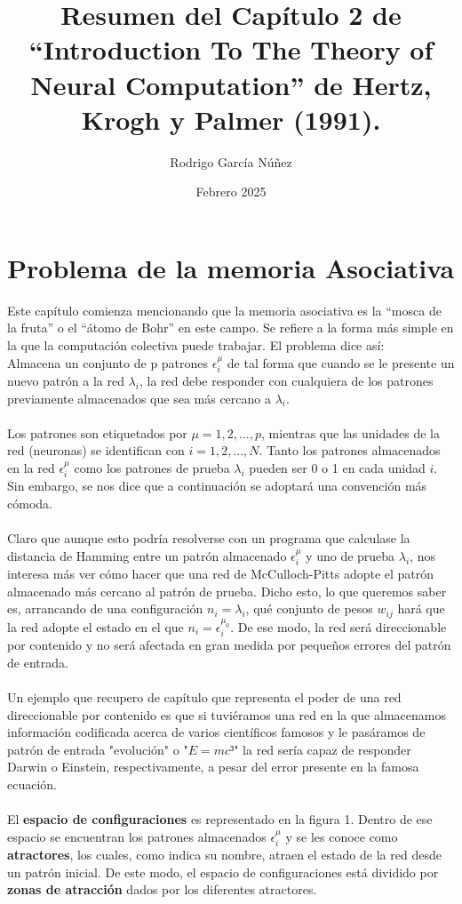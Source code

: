 \documentclass{article}
\title{Resumen del Capítulo 2 de “Introduction To The Theory of Neural Computation” de Hertz, Krogh y Palmer (1991).}
\author{Rodrigo García Núñez}
\affil{Universidad Autónoma Metropolitana }
\date{Febrero 2025}
\begin{document}
\maketitle

\section{Problema de la memoria Asociativa}

Este capítulo comienza mencionando que la memoria asociativa es la “mosca de la fruta” o
el “átomo de Bohr” en este campo. Se refiere a la forma más simple en la que la
computación colectiva puede trabajar. El problema dice así:
\\
Almacena un conjunto de p patrones $\epsilon^\mu_i$ de tal forma que cuando se le presente un nuevo patrón a la red $\lambda_i$, la red debe responder con cualquiera de los patrones previamente almacenados que sea más cercano a $\lambda_i$.
\\\\
Los patrones son etiquetados por $\mu = 1, 2, ..., p$, mientras que las unidades de la red (neuronas) se identifican con $i= 1, 2, ..., N$. Tanto los patrones almacenados en la red $\epsilon^\mu_i$ como los patrones de prueba $\lambda_i$ pueden ser 0 o 1 en cada unidad $i$. Sin embargo, se nos dice que a continuación se adoptará una convención más cómoda.
\\\\
Claro que aunque esto podría resolverse con un programa que calculase la distancia de Hamming entre un patrón almacenado $\epsilon^\mu_i$ y uno de prueba $\lambda_i$, nos interesa más ver cómo hacer que una red de McCulloch-Pitts adopte el patrón almacenado más cercano al patrón de prueba. Dicho esto, lo que queremos saber es, arrancando de una configuración $n_i = \lambda_i$, qué conjunto de pesos $w_{ij}$ hará que la red adopte el estado en el que $n_i = \epsilon^{\mu_0}_i$. De ese modo, la red será direccionable por contenido y no será afectada en gran medida por pequeños errores del patrón de entrada.
\\\\
Un ejemplo que recupero de capítulo que representa el poder de una red direccionable por contenido es que si tuviéramos una red en la que almacenamos información codificada acerca de varios científicos famosos y le pasáramos de patrón de entrada "evolución" o "$E = mc³$" la red sería capaz de responder Darwin o Einstein, respectivamente, a pesar del error presente en la famosa ecuación.
\\\\
El \textbf{espacio de configuraciones} es representado en la figura 1. Dentro de ese espacio se encuentran los patrones almacenados $\epsilon^\mu_i$ y se les conoce como \textbf{atractores}, los cuales, como indica su nombre, atraen el estado de la red desde un patrón inicial. De este modo, el espacio de configuraciones está dividido por \textbf{zonas de atracción} dados por los diferentes atractores.
\end{document}
